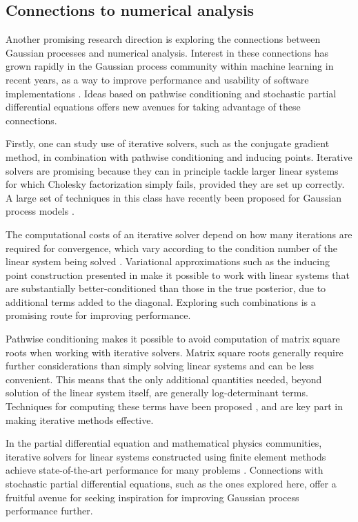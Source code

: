 \documentclass[11pt]{book}
\begin{document}
\subsection*{Connections to numerical analysis}

Another promising research direction is exploring the connections between Gaussian processes and numerical analysis.
Interest in these connections has grown rapidly in the Gaussian process community within machine learning in recent years, as a way to improve performance and usability of software implementations \cite{matthews17,gardner18,vanderwilk20}. 
Ideas based on pathwise conditioning and stochastic partial differential equations offers new avenues for taking advantage of these connections.

Firstly, one can study use of iterative solvers, such as the conjugate gradient method, in combination with pathwise conditioning and inducing points.
Iterative solvers are promising because they can in principle tackle larger linear systems for which Cholesky factorization simply fails, provided they are set up correctly.
A large set of techniques in this class have recently been proposed for Gaussian process models \cite{dong17,gardner18,pleiss18,meanti20,pleiss20}.

The computational costs of an iterative solver depend on how many iterations are required for convergence, which vary according to the condition number of the linear system being solved \cite{saad03}.
Variational approximations such as the inducing point construction presented in  make it possible to work with linear systems that are substantially better-conditioned than those in the true posterior, due to additional terms added to the diagonal.
Exploring such combinations is a promising route for improving performance.

Pathwise conditioning makes it possible to avoid computation of matrix square roots when working with iterative solvers.
Matrix square roots generally require further considerations than simply solving linear systems \cite{pleiss20} and can be less convenient.
This means that the only additional quantities needed, beyond solution of the linear system itself, are generally log-determinant terms.
Techniques for computing these terms have been proposed \cite{dong17}, and are key part in making iterative methods effective.

In the partial differential equation and mathematical physics communities, iterative solvers for linear systems constructed using finite element methods achieve state-of-the-art performance for many problems \cite{evans10,lord14}.
Connections with stochastic partial differential equations, such as the ones explored here, offer a fruitful avenue for seeking inspiration for improving Gaussian process performance further.
\end{document}
